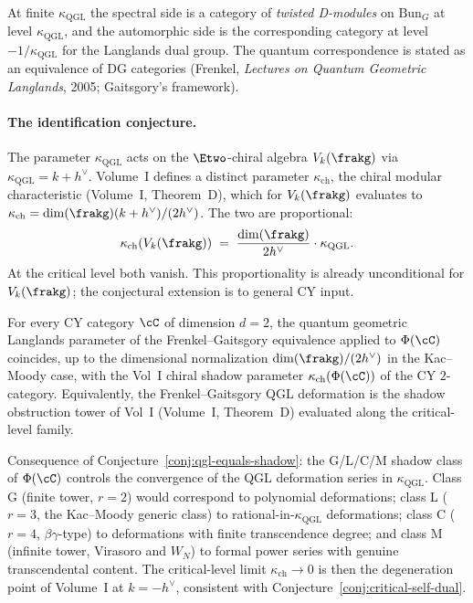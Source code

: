 At finite $\kappa_{\mathrm{QGL}}$ the spectral side is a category of \emph{twisted D-modules} on $\mathrm{Bun}_G$ at level $\kappa_{\mathrm{QGL}}$, and the automorphic side is the corresponding category at level $-1/\kappa_{\mathrm{QGL}}$ for the Langlands dual group. The quantum correspondence is stated as an equivalence of DG categories (Frenkel, \emph{Lectures on Quantum Geometric Langlands}, 2005; Gaitsgory's framework).

\paragraph{The identification conjecture.} The parameter $\kappa_{\mathrm{QGL}}$ acts on the $\Etwo$-chiral algebra $V_{k}(\frakg)$ via $\kappa_{\mathrm{QGL}} = k + h^\vee$. Volume~I defines a distinct parameter $\kappa_{\mathrm{ch}}$, the chiral modular characteristic (Volume~I, Theorem~D), which for $V_k(\frakg)$ evaluates to $\kappa_{\mathrm{ch}} = \dim(\frakg)(k + h^\vee)/(2 h^\vee)$. The two are proportional:
\[
 \kappa_{\mathrm{ch}}(V_k(\frakg)) \;=\; \frac{\dim(\frakg)}{2 h^\vee} \cdot \kappa_{\mathrm{QGL}}.
\]
At the critical level both vanish. This proportionality is already unconditional for $V_k(\frakg)$; the conjectural extension is to general CY input.

\begin{conjecture}
\label{conj:qgl-equals-shadow}
\ClaimStatusConjectured
For every CY category $\cC$ of dimension $d = 2$, the quantum geometric Langlands parameter of the Frenkel--Gaitsgory equivalence applied to $\Phi(\cC)$ coincides, up to the dimensional normalization $\dim(\frakg)/(2 h^\vee)$ in the Kac--Moody case, with the Vol~I chiral shadow parameter $\kappa_{\mathrm{ch}}(\Phi(\cC))$ of the CY $2$-category. Equivalently, the Frenkel--Gaitsgory QGL deformation is the shadow obstruction tower of Vol~I (Volume~I, Theorem~D) evaluated along the critical-level family.
\end{conjecture}

Consequence of Conjecture~\ref{conj:qgl-equals-shadow}:
the G/L/C/M shadow class of $\Phi(\cC)$ controls the convergence of the QGL deformation series in $\kappa_{\mathrm{QGL}}$.
Class G (finite tower, $r = 2$) would correspond to polynomial deformations;
class L ($r = 3$, the Kac--Moody generic class) to rational-in-$\kappa_{\mathrm{QGL}}$ deformations;
class C ($r = 4$, $\beta\gamma$-type) to deformations with finite transcendence degree;
and class M (infinite tower, Virasoro and $W_N$) to formal power series with genuine transcendental content.
The critical-level limit $\kappa_{\mathrm{ch}} \to 0$ is then the degeneration point of Volume~I at $k = -h^\vee$, consistent with Conjecture~\ref{conj:critical-self-dual}.

